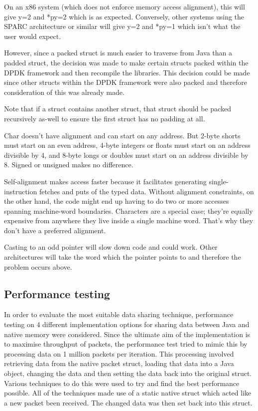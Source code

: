 \documentclass[final_report.tex]{subfiles}
\begin{document}
On an x86 system (which does not enforce memory access alignment), this will give y=2 and *py=2 which is as expected. Conversely, other systems using the SPARC architecture or similar will give y=2 and *py=1 which isn't what the user would expect.

However, since a packed struct is much easier to traverse from Java than a padded struct, the decision was made to make certain structs packed within the DPDK framework and then recompile the libraries. This decision could be made since other structs within the DPDK framework were also packed and therefore consideration of this was already made.

Note that if a struct contains another struct, that struct should be packed recursively as-well to ensure the first struct has no padding at all.

Char doesn't have alignment and can start on any address. But 2-byte shorts must start on an even address, 4-byte integers or floats must start on an address divisible by 4, and 8-byte longs or doubles must start on an address divisible by 8. Signed or unsigned makes no difference.

Self-alignment makes access faster because it facilitates generating single-instruction fetches and puts of the typed data. Without alignment constraints, on the other hand, the code might end up having to do two or more accesses spanning machine-word boundaries. Characters are a special case; they're equally expensive from anywhere they live inside a single machine word. That's why they don't have a preferred alignment.

Casting to an odd pointer will slow down code and could work. Other architectures will take the word which the pointer points to and therefore the problem occurs above.

\subsection{Performance testing}
In order to evaluate the most suitable data sharing technique, performance testing on 4 different implementation options for sharing data between Java and native memory were considered. Since the ultimate aim of the implementation is to maximise throughput of packets, the performance test tried to mimic this by processing data on 1 million packets per iteration. This processing involved retrieving data from the native packet struct, loading that data into a Java object, changing the data and then setting the data back into the original struct. Various techniques to do this were used to try and find the best performance possible. All of the techniques made use of a static native struct which acted like a new packet been received. The changed data was then set back into this struct.
\end{document}
